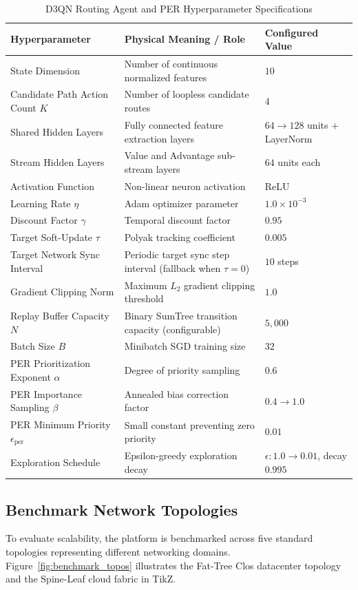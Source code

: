 \documentclass[12pt,a4paper,oneside]{report}
\begin{document}
\begin{table}[htbp]
\centering
\caption{D3QN Routing Agent and PER Hyperparameter Specifications}
\label{tab:hyperparameters}
\footnotesize
\begin{tabularx}{\textwidth}{l X l}
\toprule
\textbf{Hyperparameter} & \textbf{Physical Meaning / Role} & \textbf{Configured Value} \\
\midrule
State Dimension & Number of continuous normalized features & $10$ \\
Candidate Path Action Count $K$ & Number of loopless candidate routes & $4$ \\
Shared Hidden Layers & Fully connected feature extraction layers & $64 \to 128$ units + LayerNorm \\
Stream Hidden Layers & Value and Advantage sub-stream layers & $64$ units each \\
Activation Function & Non-linear neuron activation & ReLU \\
Learning Rate $\eta$ & Adam optimizer parameter & $1.0 \times 10^{-3}$ \\
Discount Factor $\gamma$ & Temporal discount factor & $0.95$ \\
Target Soft-Update $\tau$ & Polyak tracking coefficient & $0.005$ \\
Target Network Sync Interval & Periodic target sync step interval (fallback when $\tau=0$) & $10$ steps \\
Gradient Clipping Norm & Maximum $L_2$ gradient clipping threshold & $1.0$ \\
Replay Buffer Capacity $N$ & Binary SumTree transition capacity (configurable) & $5,000$ \\
Batch Size $B$ & Minibatch SGD training size & $32$ \\
PER Prioritization Exponent $\alpha$ & Degree of priority sampling & $0.6$ \\
PER Importance Sampling $\beta$ & Annealed bias correction factor & $0.4 \to 1.0$ \\
PER Minimum Priority $\epsilon_{\text{per}}$ & Small constant preventing zero priority & $0.01$ \\
Exploration Schedule & Epsilon-greedy exploration decay & $\epsilon: 1.0 \to 0.01$, decay $0.995$ \\
\bottomrule
\end{tabularx}
\end{table}

\subsection{Benchmark Network Topologies}
To evaluate scalability, the platform is benchmarked across five standard topologies representing different networking domains. Figure~\ref{fig:benchmark_topos} illustrates the Fat-Tree Clos datacenter topology and the Spine-Leaf cloud fabric in TikZ.
\end{document}
